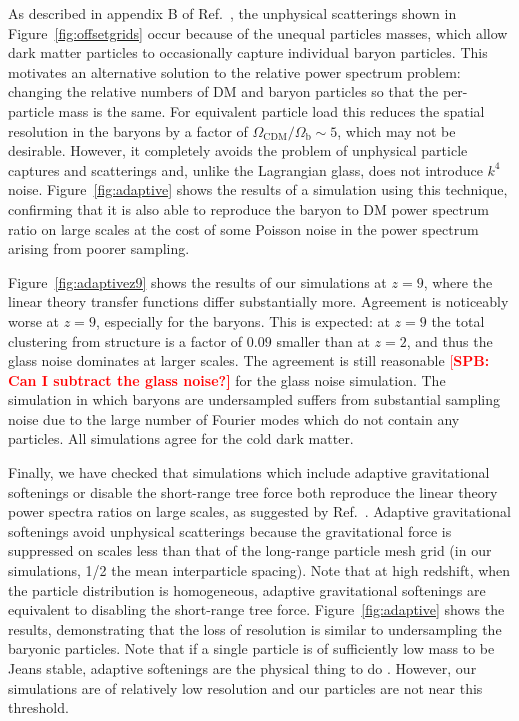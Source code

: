 \documentclass[a4paper,11pt]{article}
\newcommand{\spb}[1]{\textcolor{red}{[\bf SPB: #1]} }
\begin{document}
As described in appendix B of Ref.~\cite{OLeary:2012}, the unphysical scatterings shown in Figure~\ref{fig:offsetgrids} occur because of the unequal particles masses, which allow dark matter particles to occasionally capture individual baryon particles. This motivates
an alternative solution to the relative power spectrum problem: changing the relative numbers of DM and baryon particles so that the per-particle mass is the same. For equivalent particle load this reduces the spatial resolution in the baryons by a factor of $\Omega_\mathrm{CDM}/\Omega_\mathrm{b} \sim 5$, which may not be desirable. However, it completely avoids the problem of unphysical particle captures and scatterings and, unlike the Lagrangian glass, does not introduce $k^4$ noise. Figure~\ref{fig:adaptive} shows the results of a simulation using this technique, confirming that it is also able to reproduce the baryon to DM power spectrum ratio on large scales at the cost of some Poisson noise in the power spectrum arising from poorer sampling.

Figure~\ref{fig:adaptivez9} shows the results of our simulations at $z=9$, where the linear theory transfer functions differ substantially more. Agreement is noticeably worse at $z=9$, especially for the baryons. This is expected: at $z=9$ the total clustering from structure is a factor of $0.09$ smaller than at $z=2$, and thus the  glass noise dominates at larger scales. The agreement is still reasonable \spb{Can I subtract the glass noise?} for the glass noise simulation. The simulation in which baryons are undersampled suffers from substantial sampling noise due to the large number of Fourier modes which do not contain any particles. All simulations agree for the cold dark matter.

Finally, we have checked that simulations which include adaptive gravitational softenings or disable the short-range tree force both reproduce the linear theory power spectra ratios on large scales, as suggested by Ref.~\cite{Angulo:2013}. Adaptive gravitational softenings avoid unphysical scatterings because the gravitational force is suppressed on scales less than that of the long-range particle mesh grid (in our simulations, 1/2 the mean interparticle spacing). Note that at high redshift, when the particle distribution is homogeneous, adaptive gravitational softenings are equivalent to disabling the short-range tree force.
Figure~\ref{fig:adaptive} shows the results, demonstrating that the loss of resolution is similar to undersampling the baryonic particles. Note that if a single particle is of sufficiently low mass to be Jeans stable, adaptive softenings are the physical thing to do \cite{Fire2:2018}. However, our simulations are of relatively low resolution and our particles are not near this threshold.
\end{document}
